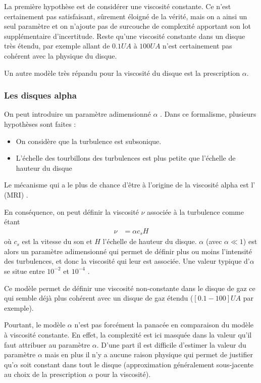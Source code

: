 La première hypothèse est de considérer une viscosité constante. Ce n'est certainement pas satisfaisant, sûrement éloigné de la vérité, mais on a ainsi un seul paramètre et on n'ajoute pas de surcouche de complexité apportant son lot supplémentaire d'incertitude. Reste qu'une viscosité constante dans un disque très étendu, par exemple allant de $0.1\unit{UA}$ à $100\unit{UA}$ n'est certainement pas cohérent avec la physique du disque. 

Un autre modèle très répandu pour la viscosité du disque est la prescription $\alpha$.

\subsubsection{Les disques alpha}\label{sec:viscosite-alpha}
On peut introduire un paramètre adimensionné $\alpha$ \citep{shakura1973black}. Dans ce formalisme, plusieurs hypothèses sont faites : 
\begin{itemize}
\item On considère que la turbulence est subsonique.
\item L'échelle des tourbillons des turbulences est plus petite que l'échelle de hauteur du disque
\end{itemize}
Le mécanisme qui a le plus de chance d'être à l'origine de la viscosité alpha est l' (MRI) \citep{balbus1991powerful}. 

\bigskip

En conséquence, on peut définir la viscosité $\nu$ associée à la turbulence comme étant 
\begin{align}
\nu &= \alpha c_s H
\end{align}
où $c_s$ est la vitesse du son et $H$ l'échelle de hauteur du disque. $\alpha$ (avec $\alpha \ll 1$) est alors un paramètre adimensionné qui permet de définir plus ou moins l'intensité des turbulences, et donc la viscosité qui leur est associée. Une valeur typique d'$\alpha$ se situe entre $10^{-2}$ et $10^{-4}$ \citep{guilloteau2011dual}.

Ce modèle permet de définir une viscosité non-constante dans le disque de gaz ce qui semble déjà plus cohérent avec un disque de gaz étendu ($[0.1-100]\unit{UA}$ par exemple). 

Pourtant, le modèle $\alpha$ n'est pas forcément la panacée en comparaison du modèle à viscosité constante. En effet, la complexité est ici masquée dans la valeur qu'il faut attribuer au paramètre $\alpha$. D'une part il est difficile d'estimer la valeur du paramètre $\alpha$ mais en plus il n'y a aucune raison physique qui permet de justifier qu'$\alpha$ soit constant dans tout le disque (approximation généralement sous-jacente au choix de la prescription $\alpha$ pour la viscosité).

